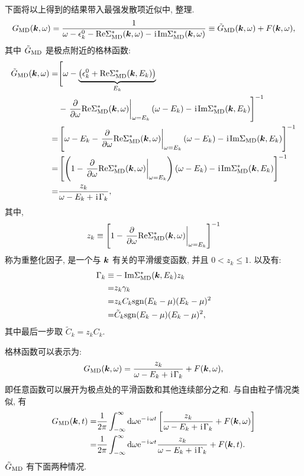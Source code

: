 下面将以上得到的结果带入最强发散项近似中, 整理.
\begin{equation}
    G_{\mathrm{MD}}(\boldsymbol{k},\omega)=\frac{1}{\omega-\epsilon_k^0-\mathrm{Re}\Sigma_{\mathrm{MD}}^*(\boldsymbol{k},\omega)-\hspace{0.1em}\mathrm{i}\hspace{0.1em}\mathrm{Im}\Sigma_{\mathrm{MD}}^*(\boldsymbol{k},\omega)}\equiv \tilde{G}_{\mathrm{MD}}(\boldsymbol{k},\omega)+F(\boldsymbol{k},\omega),
\end{equation}
其中 $\tilde{G}_{\mathrm{MD}}$ 是极点附近的格林函数: 
  \begin{align}
        \tilde{G}_{\mathrm{MD}}(\boldsymbol{k},\omega)=& \Bigg[ \omega-\underbrace{\left(\epsilon_k^0+\mathrm{Re}\Sigma_{\mathrm{MD}}^*(\boldsymbol{k},E_k)\right)}_{E_k}\nonumber\\
&-\left. \frac{\partial}{\partial \omega}\mathrm{Re}\Sigma_{\mathrm{MD}}^*(\boldsymbol{k},\omega) \right|_{\omega=E_k}(\omega-E_k)-\hspace{0.1em}\mathrm{i}\hspace{0.1em}\mathrm{Im}\Sigma_{\mathrm{MD}}^*(\boldsymbol{k},E_k) \Bigg]^{-1}\nonumber\\
        =&\left[ \omega-E_k-\left. \frac{\partial}{\partial \omega}\mathrm{Re}\Sigma_{\mathrm{MD}}^*(\boldsymbol{k},\omega) \right|_{\omega=E_k}(\omega-E_k)-\hspace{0.1em}\mathrm{i}\hspace{0.1em}\mathrm{Im}\Sigma_{\mathrm{MD}}(\boldsymbol{k},E_k) \right]^{-1}\nonumber\\
        =&\left[ \left( 1-\left. \frac{\partial}{\partial \omega}\mathrm{Re}\Sigma_{\mathrm{MD}}^*(\boldsymbol{k},\omega) \right|_{\omega=E_k} \right)(\omega-E_k)-\hspace{0.1em}\mathrm{i}\hspace{0.1em}\mathrm{Im}\Sigma_{\mathrm{MD}}^*(\boldsymbol{k},E_k) \right]^{-1}\nonumber\\
        =&\frac{z_k}{\omega-E_k+\hspace{0.1em}\mathrm{i}\hspace{0.1em} \Gamma_k},
    \end{align}
其中, 
\begin{equation}
    z_k\equiv \left[ 1-\left. \frac{\partial}{\partial \omega}\mathrm{Re}\Sigma_{\mathrm{MD}}^*(\boldsymbol{k},\omega) \right|_{\omega=E_k} \right]^{-1}
\end{equation}
称为重整化因子, 是一个与 $\boldsymbol{k}$ 有关的平滑缓变函数, 并且 $0<z_k\le 1$. 以及有: 
 \begin{align}
        \Gamma_k\equiv &-\mathrm{Im}\Sigma_{\mathrm{MD}}^*(\boldsymbol{k},E_k)z_k\nonumber\\
        =&z_k\gamma_k\nonumber\\
        =&z_kC_k\mathrm{sgn}(E_k-\mu)(E_k-\mu)^2\nonumber\\
        =&\tilde{C}_k\mathrm{sgn}(E_k-\mu)(E_k-\mu)^2,
    \end{align}
其中最后一步取 $\tilde{C}_k=z_kC_k$.

格林函数可以表示为: 
\begin{equation}
    G_{\mathrm{MD}}(\boldsymbol{k},\omega)=\frac{z_k}{\omega-E_k+\hspace{0.1em}\mathrm{i}\hspace{0.1em}\Gamma_k}+F(\boldsymbol{k},\omega),
\end{equation}
即任意函数可以展开为极点处的平滑函数和其他连续部分之和. 与自由粒子情况类似, 有 
  \begin{align}
        G_{\mathrm{MD}}(\boldsymbol{k},t)=&\frac{1}{2\pi}\int_{-\infty}^{\infty}\mathrm{d}\omega\mathrm{e}^{-\hspace{0.1em}\mathrm{i}\hspace{0.1em}\omega t}\left[ \frac{z_k}{\omega-E_k+\hspace{0.1em}\mathrm{i}\hspace{0.1em}\Gamma_k}+F(\boldsymbol{k},\omega) \right]\nonumber\\
        =&\frac{1}{2\pi}\int_{-\infty}^\infty \mathrm{d}\omega \mathrm{e}^{-\hspace{0.1em}\mathrm{i}\hspace{0.1em}\omega t}\frac{z_k}{\omega-E_k+\hspace{0.1em}\mathrm{i}\hspace{0.1em}\Gamma_k}+F(\boldsymbol{k},t).
    \end{align}
$\tilde{G}_{\mathrm{MD}}$ 有下面两种情况.


